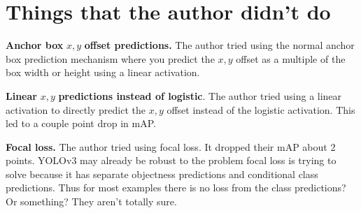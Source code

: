 \documentclass[10pt,twocolumn,letterpaper]{article}
\begin{document}
\section{Things that the author didn't do}
\textbf{Anchor box} $x,y$ \textbf{offset predictions.} The author tried using the normal anchor box prediction mechanism where you predict the $x,y$ offset as a multiple of the box width or height using a linear activation. 
\par
\textbf{Linear} $x,y$ \textbf{predictions instead of logistic}. The author tried using a linear activation to directly predict the $x,y$ offset instead of the logistic activation. This led to a couple point drop in mAP.
\par
\textbf{Focal loss.} The author tried using focal loss. It dropped their mAP about 2 points. YOLOv3 may already be robust to the problem focal loss is trying to solve because it has separate objectness predictions and conditional class predictions. Thus for most  examples there is no loss from the class predictions? Or something? They aren’t totally sure.

{\small
	
	
	
}
\end{document}
